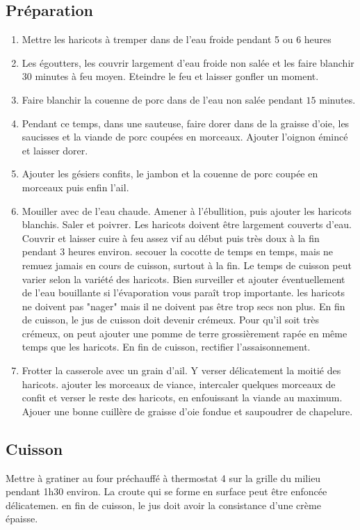 \subsection*{Préparation}
\begin{enumerate}
\item Mettre les haricots à tremper dans de l'eau froide pendant 5 ou 6 heures
\item Les égoutters, les couvrir largement d'eau froide non salée et les faire blanchir $30$ minutes à feu moyen. Eteindre le feu et laisser gonfler un moment.
\item Faire blanchir la couenne de porc dans de l'eau non salée pendant $15$ minutes.
\item Pendant ce temps, dans une sauteuse, faire dorer dans de la graisse d'oie, les saucisses et la viande de porc coupées en morceaux. Ajouter l'oignon émincé et laisser dorer.
\item Ajouter les gésiers confits, le jambon et la couenne de porc coupée en morceaux puis enfin l'ail.
\item Mouiller avec de l'eau chaude. Amener à l'ébullition, puis ajouter les haricots blanchis. Saler et poivrer. Les haricots doivent être largement couverts d'eau. Couvrir et laisser cuire à feu assez vif au début puis très doux à la fin pendant 3 heures environ. secouer la cocotte de temps en temps, mais ne remuez jamais en cours de cuisson, surtout à la fin. Le temps de cuisson peut varier selon la variété des haricots. Bien surveiller et ajouter éventuellement de l'eau bouillante si l'évaporation vous paraît trop importante. les haricots ne doivent pas "nager" mais il ne doivent pas être trop secs non plus. En fin de cuisson, le jus de cuisson doit devenir crémeux. Pour qu'il soit très crémeux, on peut ajouter une pomme de terre grossièrement rapée en même temps que les haricots. En fin de cuisson, rectifier l'assaisonnement.
\item Frotter la casserole avec un grain d'ail. Y verser délicatement la moitié des haricots. ajouter les morceaux de viance, intercaler quelques morceaux de confit et verser le reste des haricots, en enfouissant la viande au maximum. Ajouer une bonne cuillère de graisse d'oie fondue et saupoudrer de chapelure.
\end{enumerate}

\subsection*{Cuisson}
Mettre à gratiner au four préchauffé à thermostat 4 sur la grille du milieu pendant 1h30 environ. La croute qui se forme en surface peut être enfoncée délicatemen. en fin de cuisson, le jus doit avoir la consistance d'une crème épaisse.

